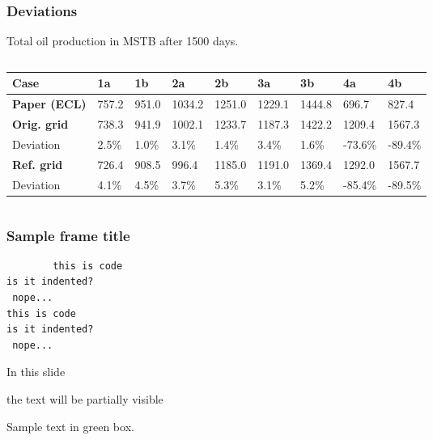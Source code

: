 \documentclass{beamer}
\begin{document}
%
\begin{frame}
    \frametitle{Deviations}
    Total oil production in MSTB after 1500 days.

    \vspace{2em}
    
    \footnotesize
    \begin{columns}[c]
        \begin{tabular}{lllllllll}
         \toprule
         \textbf{Case}        & 1a     & 1b     & 2a     & 2b     & 3a     & 3b     & 4a     & 4b  \\
         \midrule
         \textbf{Paper (ECL)} & 757.2  & 951.0  & 1034.2 & 1251.0 & 1229.1 & 1444.8 & 696.7  & 827.4  \\
         \midrule
         \textbf{Orig. grid}  & 738.3  & 941.9  & 1002.1 & 1233.7 & 1187.3 & 1422.2 & 1209.4 & 1567.3 \\
         Deviation            & 2.5\%  & 1.0\%  & 3.1\%  & 1.4\%  & 3.4\%  & 1.6\%  & -73.6\%& -89.4\%\\
         \midrule
         \textbf{Ref. grid}   & 726.4  & 908.5  & 996.4  & 1185.0 & 1191.0 & 1369.4 & 1292.0 & 1567.7 \\
         Deviation            & 4.1\%  & 4.5\%  & 3.7\%  & 5.3\%  & 3.1\%  & 5.2\%  & -85.4\%& -89.5\%\\
         \bottomrule
        \end{tabular}
    \end{columns}
\end{frame}

\begin{frame}[fragile]
	\frametitle{Sample frame title}
	\begin{code}
        \begin{verbatim}
        this is code
is it indented?
 nope...
this is code
is it indented?
 nope...
        \end{verbatim}
    \end{code}
\end{frame}

\begin{frame}
 In this slide \pause
 
 the text will be partially visible
\end{frame}


\begin{frame}
	\begin{remark}
		Sample text in green box.
	\end{remark}
\end{frame}
 
\end{document}
